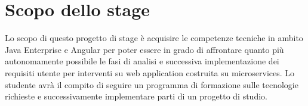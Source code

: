 \section*{Scopo dello stage}
Lo scopo di questo progetto di stage è acquisire le competenze tecniche in ambito Java Enterprise e
Angular per poter essere in grado di affrontare quanto più autonomamente possibile le fasi di analisi e
successiva implementazione dei requisiti utente per interventi su web application costruita su microservices.
Lo studente avrà il compito di seguire un programma di formazione sulle tecnologie richieste e successivamente
implementare parti di un progetto di studio.
